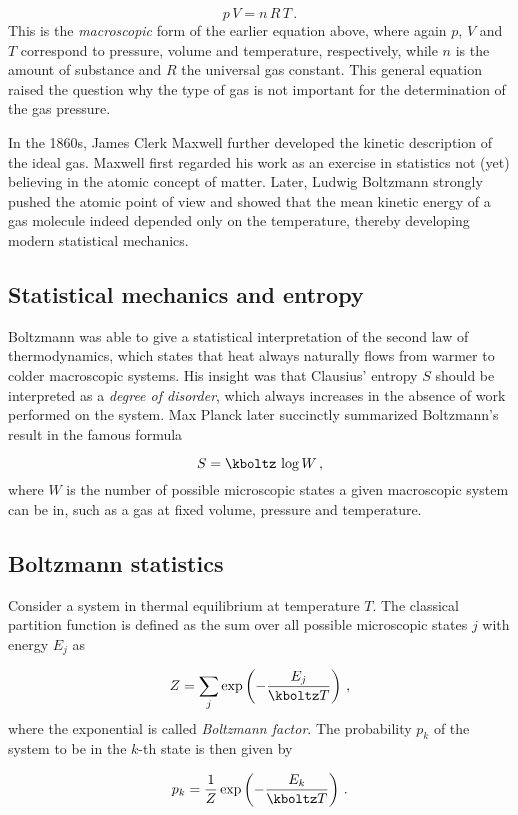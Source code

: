 \begin{equation*}\label{eq:ideal-nr}
  p\, V=n\, R\, T\,.
\end{equation*}
%
This is the \emph{macroscopic} form of the earlier equation above, where again $p$, $V$ and $T$ correspond to pressure, volume and temperature, respectively, while $n$ is the amount of substance and $R$ the universal gas constant. This general equation raised the question why the type of gas is not important for the determination of the gas pressure.

In the 1860s, James Clerk Maxwell further developed the kinetic description of the ideal gas. Maxwell first regarded his work as an exercise in statistics not (yet) believing in the atomic concept of matter. Later, Ludwig Boltzmann strongly pushed the atomic point of view and showed that the mean kinetic energy of a gas molecule indeed depended only on the temperature, thereby developing modern statistical mechanics.


\subsection*{Statistical mechanics and entropy}
 
Boltzmann was able to give a statistical interpretation of the second law of thermodynamics, which states that heat always naturally flows from warmer to colder macroscopic systems. His insight was that Clausius' entropy $S$ should be interpreted as a \emph{degree of disorder}, which always increases in the absence of work performed on the system. Max Planck later succinctly summarized Boltzmann's result in the famous formula

\begin{equation*}\label{eq:ideal-nr}
  S=\kboltz\, \log W\,,
\end{equation*}
%
where $W$ is the number of possible microscopic states a given macroscopic system can be in, such as a gas at fixed volume, pressure and temperature.


\subsection*{Boltzmann statistics}

Consider a system in thermal equilibrium at temperature $T$. The classical partition function is defined as the sum over all possible microscopic states $j$ with energy $E_j$ as

\begin{equation*}\label{eq:ideal-nr}
  Z=\sum_j \exp \left(-\frac{E_j}{\kboltz T}\right)\,,
\end{equation*}
%
where the exponential is called \emph{Boltzmann factor}. The probability $p_k$ of the system to be in the $k$-th state is then given by

\begin{equation*}\label{eq:ideal-nr}
  p_k=\frac{1}{Z} \exp \left(-\frac{E_k}{\kboltz T}\right)\,.
\end{equation*}
